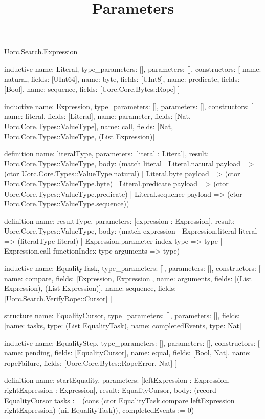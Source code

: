 \begin{lexlean}{Uorc.Search.Expression}
\title{Parameters}
\begin{semanticmodule}
inductive{
  name: Literal,
  type_parameters: [],
  parameters: [],
  constructors: [
    {name: natural, fields: [UInt64]},
    {name: byte, fields: [UInt8]},
    {name: predicate, fields: [Bool]},
    {name: sequence, fields: [Uorc.Core.Bytes::Rope]}
  ]
}

inductive{
  name: Expression,
  type_parameters: [],
  parameters: [],
  constructors: [
    {name: literal, fields: [Literal]},
    {name: parameter, fields: [Nat, Uorc.Core.Types::ValueType]},
    {name: call, fields: [Nat, Uorc.Core.Types::ValueType, (List Expression)]}
  ]
}

definition{
  name: literalType,
  parameters: [literal : Literal],
  result: Uorc.Core.Types::ValueType,
  body: (match literal
    | Literal.natural payload => (ctor Uorc.Core.Types::ValueType.natural)
    | Literal.byte payload => (ctor Uorc.Core.Types::ValueType.byte)
    | Literal.predicate payload => (ctor Uorc.Core.Types::ValueType.predicate)
    | Literal.sequence payload => (ctor Uorc.Core.Types::ValueType.sequence))
}

definition{
  name: resultType,
  parameters: [expression : Expression],
  result: Uorc.Core.Types::ValueType,
  body: (match expression
    | Expression.literal literal => (literalType literal)
    | Expression.parameter index type => type
    | Expression.call functionIndex type arguments => type)
}

inductive{
  name: EqualityTask,
  type_parameters: [],
  parameters: [],
  constructors: [
    {name: compare, fields: [Expression, Expression]},
    {name: arguments, fields: [(List Expression), (List Expression)]},
    {name: sequence, fields: [Uorc.Search.VerifyRope::Cursor]}
  ]
}

structure{
  name: EqualityCursor,
  type_parameters: [],
  parameters: [],
  fields: [{name: tasks, type: (List EqualityTask)}, {name: completedEvents, type: Nat}]
}

inductive{
  name: EqualityStep,
  type_parameters: [],
  parameters: [],
  constructors: [
    {name: pending, fields: [EqualityCursor]},
    {name: equal, fields: [Bool, Nat]},
    {name: ropeFailure, fields: [Uorc.Core.Bytes::RopeError, Nat]}
  ]
}

definition{
  name: startEquality,
  parameters: [leftExpression : Expression, rightExpression : Expression],
  result: EqualityCursor,
  body: (record EqualityCursor {tasks := (cons (ctor EqualityTask.compare leftExpression rightExpression) (nil EqualityTask)), completedEvents := 0})
}


\end{semanticmodule}
\end{lexlean}
